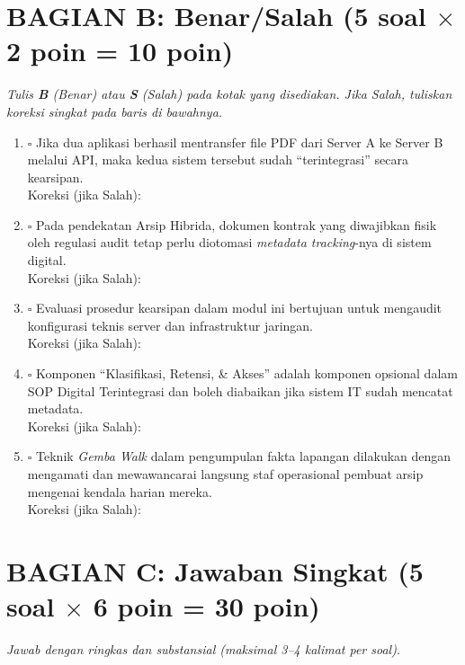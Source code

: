 \documentclass[12pt,a4paper]{report}
\newcommand{\ansline}[1][5.5cm]{\underline{\hspace{#1}}}
\begin{document}
\newpage
\section{BAGIAN B: Benar/Salah (5 soal $\times$ 2 poin = 10 poin)}
\textit{Tulis \textbf{B} (Benar) atau \textbf{S} (Salah) pada kotak yang disediakan. Jika Salah, tuliskan koreksi singkat pada baris di bawahnya.}

\vspace{0.3cm}

\begin{enumerate}[leftmargin=*, itemsep=0.6cm]

\item $\square$ \quad Jika dua aplikasi berhasil mentransfer file PDF dari Server A ke Server B melalui API, maka kedua sistem tersebut sudah ``terintegrasi'' secara kearsipan.\\[0.2cm]
Koreksi (jika Salah): \ansline[12cm]

\item $\square$ \quad Pada pendekatan Arsip Hibrida, dokumen kontrak yang diwajibkan fisik oleh regulasi audit tetap perlu diotomasi \textit{metadata tracking}-nya di sistem digital.\\[0.2cm]
Koreksi (jika Salah): \ansline[12cm]

\item $\square$ \quad Evaluasi prosedur kearsipan dalam modul ini bertujuan untuk mengaudit konfigurasi teknis server dan infrastruktur jaringan.\\[0.2cm]
Koreksi (jika Salah): \ansline[12cm]

\item $\square$ \quad Komponen ``Klasifikasi, Retensi, \& Akses'' adalah komponen opsional dalam SOP Digital Terintegrasi dan boleh diabaikan jika sistem IT sudah mencatat metadata.\\[0.2cm]
Koreksi (jika Salah): \ansline[12cm]

\item $\square$ \quad Teknik \textit{Gemba Walk} dalam pengumpulan fakta lapangan dilakukan dengan mengamati dan mewawancarai langsung staf operasional pembuat arsip mengenai kendala harian mereka.\\[0.2cm]
Koreksi (jika Salah): \ansline[12cm]

\end{enumerate}

\newpage
\section{BAGIAN C: Jawaban Singkat (5 soal $\times$ 6 poin = 30 poin)}
\textit{Jawab dengan ringkas dan substansial (maksimal 3--4 kalimat per soal).}
\end{document}
